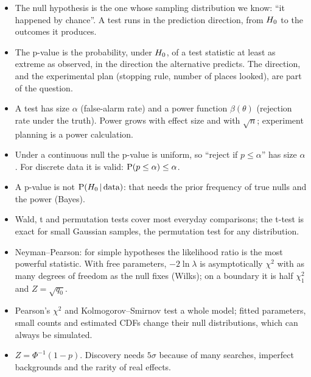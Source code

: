 \begin{recap}
\begin{itemize}
  \item The null hypothesis is the one whose sampling distribution we know:
        ``it happened by chance''. A test runs in the prediction direction,
        from $H_0$ to the outcomes it produces.
  \item The p-value is the probability, under $H_0$, of a test statistic at
        least as extreme as observed, in the direction the alternative
        predicts. The direction, and the experimental plan (stopping rule,
        number of places looked), are part of the question.
  \item A test has size $\alpha$ (false-alarm rate) and a power function
        $\beta(\theta)$ (rejection rate under the truth). Power grows with
        effect size and with $\sqrt n$; experiment planning is a power
        calculation.
  \item Under a continuous null the p-value is uniform, so ``reject if
        $p\le\alpha$'' has size $\alpha$. For discrete data it is valid:
        $\operatorname{P}(p\le\alpha)\le\alpha$.
  \item A p-value is not $\operatorname{P}(H_0\,\vert\,\text{data})$: that needs the prior
        frequency of true nulls and the power (Bayes).
  \item Wald, t and permutation tests cover most everyday comparisons; the
        t-test is exact for small Gaussian samples, the permutation test for
        any distribution.
  \item Neyman--Pearson: for simple hypotheses the likelihood ratio is the most
        powerful statistic. With free parameters, $-2\ln\lambda$ is
        asymptotically $\chi^2$ with as many degrees of freedom as the null
        fixes (Wilks); on a boundary it is half $\chi^2_1$ and $Z=\sqrt{q_0}$.
  \item Pearson's $\chi^2$ and Kolmogorov--Smirnov test a whole model; fitted
        parameters, small counts and estimated CDFs change their null
        distributions, which can always be simulated.
  \item $Z=\Phi^{-1}(1-p)$. Discovery needs $5\sigma$ because of many searches,
        imperfect backgrounds and the rarity of real effects.
\end{itemize}
\end{recap}

